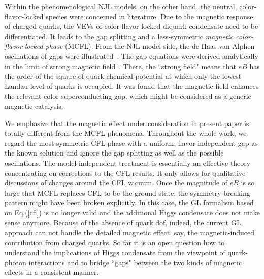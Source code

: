 \documentclass[12pt]{article}
\begin{document}
Within the phenomenological NJL models, on the other hand, the neutral, color-flavor-locked species 
were concerned in literature.
Due to the magnetic response of charged quarks, the VEVs of color-flavor-locked diquark condensate need 
to be differentiated. It leads to the gap splitting and a less-symmetric \emph{magnetic color-flavor-locked phase} 
(MCFL).
From the NJL model side, the de Haas-van Alphen oscillations of gaps were illustrated~\cite{ferrer2005magnetic,fukushima2008color}.
The gap equations were derived analytically in the limit of strong magnetic 
field~\cite{ferrer2006color,sen2015anisotropic}. There, the ``strong field" means that $eB$ has the order 
of the square of quark chemical potential at which only the lowest Landau level of quarks is occupied.
It was found that the magnetic field enhances the relevant color superconducting gap,
which might be considered as a generic magnetic catalysis.

We emphasize that the magnetic effect under consideration in present
paper is totally different from the MCFL phenomena. Throughout the whole work,
we regard the most-symmetric CFL phase with a uniform, flavor-independent gap as the known solution 
and ignore the gap splitting as well as the possible oscillations.
The model-independent treatment is essentially an effective theory concentrating on corrections to the 
CFL results. It only allows for qualitative discussions of changes around the CFL vacuum.
Once the magnitude of $eB$ is so large that MCFL replaces CFL to be the ground state, the symmetry 
breaking pattern might have been broken explicitly. In this case, the GL formalism based on Eq.(\ref{cfl}) 
is no longer valid and the additional Higgs condensate does not make sense anymore.
Because of the absence of quark dof, indeed, the current GL approach can not handle the detailed magnetic effect, 
say, the magnetic-induced contribution from charged quarks.
So far it is an open question how to understand the implications of Higgs condensate from the viewpoint of
quark-photon interactions and to bridge ``gaps" between the two kinds of magnetic effects in a consistent manner.
\end{document}
